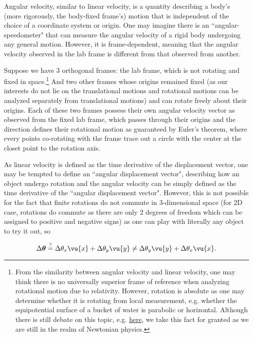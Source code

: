 \documentclass[a4paper,12pt]{report}
\begin{document}
Angular velocity, similar to linear velocity, is a quantity describing a body's (more rigorously, the body-fixed frame's) motion that is independent of the choice of a coordinate system or origin. One may imagine there is an ``angular-speedometer" that can measure the angular velocity of a rigid body undergoing any general motion. However, it is frame-dependent, meaning that the angular velocity observed in the lab frame is different from that observed from another. 

Suppose we have 3 orthogonal frames: the lab frame, which is not rotating and fixed in space.\footnote{From the similarity between angular velocity and linear velocity, one may think there is no universally superior frame of reference when analyzing rotational motion due to relativity. However, rotation is absolute as one may determine whether it is rotating from local measurement, e.g. whether the equipotential surface of a bucket of water is parabolic or horizontal. Although there is still debate on this topic, e.g. \href{https://en.wikipedia.org/wiki/Mach\%27s_principle}{here}, we take this fact for granted as we are still in the realm of Newtonian physics.} And two other frames whose origins remained fixed (as our interests do not lie on the translational motions and rotational motions can be analyzed separately from translational motions) and can rotate freely about their origins. Each of these two frames possess their own angular velocity vector as observed from the fixed lab frame, which passes through their origins and the direction defines their rotational motion as guaranteed by Euler's theorem, where every points co-rotating with the frame trace out a circle with the center at the closet point to the rotation axis.

As linear velocity is defined as the time derivative of the displacement vector, one may be tempted to define an ``angular displacement vector", describing how an object undergo rotation and the angular velocity can be simply defined as the time derivative of the ``angular displacement vector". However, this is not possible for the fact that finite rotations do not commute in 3-dimensional space (for 2D case, rotations do commute as there are only 2 degrees of freedom which can be assigned to positive and negative signs) as one can play with literally any object to try it out, so 

\begin{equation}
	\Delta \boldsymbol{\theta } \stackrel{?}{=} \Delta \theta_{x} \vu{x} + \Delta \theta_{y} \vu{y} \neq \Delta \theta_{y} \vu{y} + \Delta \theta_{x } \vu{x} . 
\end{equation}
\end{document}
